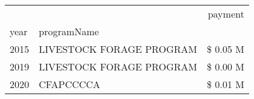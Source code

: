 \begin{tabular}{llr}
\toprule
 &  & payment \\
year & programName &  \\
\midrule
2015 & LIVESTOCK FORAGE PROGRAM & \$ 0.05 M \\
\cline{1-3}
2019 & LIVESTOCK FORAGE PROGRAM & \$ 0.00 M \\
\cline{1-3}
2020 & CFAPCCCCA & \$ 0.01 M \\
\cline{1-3}
\bottomrule
\end{tabular}
